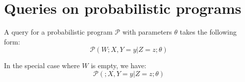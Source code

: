 \documentclass{article}
\begin{document}
\section{Queries on probabilistic programs}

A query for a probabilistic program $\mathcal{P}$ with parameters $\theta$ takes the following form:
\begin{equation}
    \mathcal{P}(W ; X, Y=y| Z=z; \theta)
\end{equation}

In the special case where $W$ is empty, we have:
\begin{equation}
    \mathcal{P}(; X, Y=y| Z=z; \theta)
\end{equation}












\end{document}
